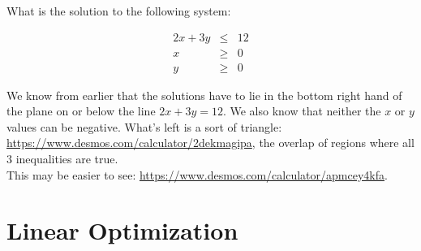 \begin{example}
What is the solution to the following system:

\begin{eqnarray*}
2x+3y&\leq&12\\
x&\geq&0\\
y&\geq&0
\end{eqnarray*}

We know from earlier that the solutions have to lie in the bottom right hand of the plane on or below the line $2x+3y=12$.  We also know that neither the $x$ or $y$ values can be negative.  What's left is a sort of triangle: \url{https://www.desmos.com/calculator/2dekmagipa}, the overlap of regions where all 3 inequalities are true.\\

This may be easier to see: \url{https://www.desmos.com/calculator/apmcey4kfa}.





\end{example}

\newpage
\section{Linear Optimization}\label{Section:LinearOptimization}

